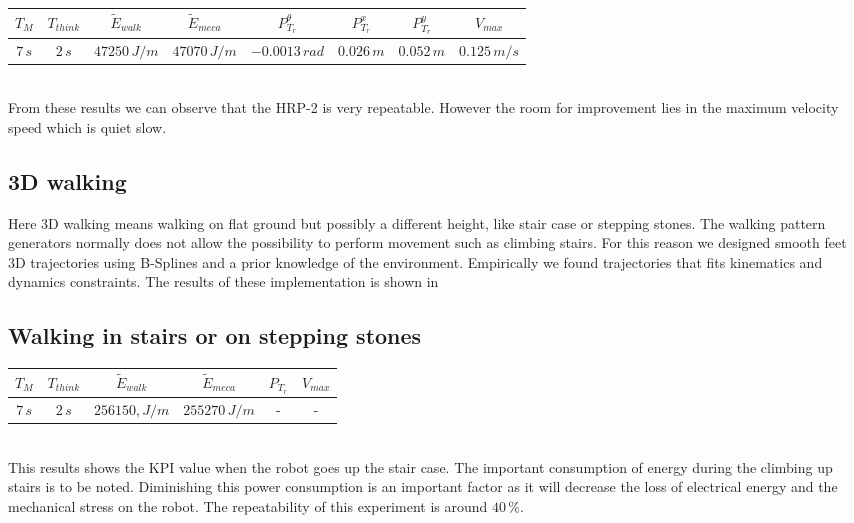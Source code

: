 \begin{tabular}{|c|c|c|c|c|c|c|c|}
\hline
   $T_M$ & $T_{think}$ & $\tilde{E}_{walk}$ & $\tilde{E}_{meca}$ &
   $P_{T_r}^\theta$ & $P_{T_r}^x$ & $P_{T_r}^y$ & $V_{max}$\\
\hline
   $7\,s$ & $2\,s$ & $47250\,J/m$ & $47070\,J/m$ &
   $-0.0013\,rad$ & $0.026\,m$ & $0.052\,m$ & $0.125\,m/s$\\
\hline
\end{tabular}
\\

From these results we can observe that the HRP-2 is very repeatable.
However the room for improvement lies in the maximum velocity speed which is quiet slow.

\subsection*{3D walking}

Here 3D walking means walking on flat ground but possibly a different height, like stair case or stepping stones.
The walking pattern generators \cite{Morisawa:ICRA:2007,herdt:iros:2010} normally does not allow the possibility to perform movement such as climbing stairs.
For this reason we designed smooth feet 3D trajectories using B-Splines and a prior knowledge of the environment.
Empirically we found trajectories that fits kinematics and dynamics constraints.
The results of these implementation is shown in \cite{naveau:ichr:2014}

\subsection*{Walking in stairs or on stepping stones}

\begin{tabular}{|c|c|c|c|c|c|}
\hline
   $T_M$ & $T_{think}$ & $\tilde{E}_{walk}$ & $\tilde{E}_{meca}$ &
   $P_{T_r}$ & $V_{max}$ \\
\hline
   $7\,s$ & $2\,s$ & $256150,J/m$ & $255270\,J/m$ &
   - & - \\
\hline
\end{tabular}
\\

This results shows the KPI value when the robot goes up the stair case.
The important consumption of energy during the climbing up stairs is to be noted.
Diminishing this power consumption is an important factor as it will decrease the loss of electrical energy and the mechanical stress on the robot.
The repeatability of this experiment is around $40\,\%$.

